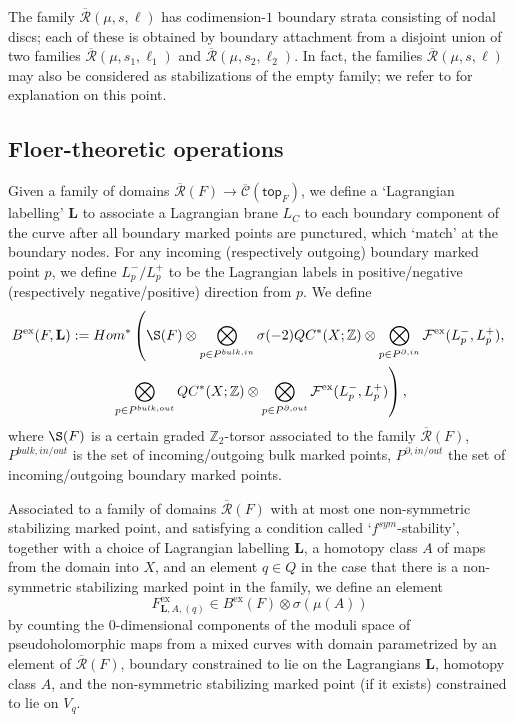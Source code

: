 \documentclass{article}
\def\fuk{\EuF}
\def\cC{\mathcal{C}}
\def\Z{\mathbb{Z}}
\def\fuk{\mathcal{F}}
\def\Rbar{\overline{\mathcal{R}}}
\def\Cbar{\overline{\mathcal{C}}}
\def\Cbar{\overline{\cC}}
\def\top{{\mathsf{top}}}
\def\bL{\mathbf{L}}
\def\ex{\mathrm{ex}}
\begin{document}
The family $\Rbar(\mu,s,\ell)$ has codimension-$1$ boundary strata consisting of nodal discs; each of these is obtained by boundary attachment from a disjoint union of two families $\Rbar(\mu,s_1,\ell_1)$ and $\Rbar(\mu,s_2,\ell_2)$. 
In fact, the families $\Rbar(\mu,s,\ell)$ may also be considered as stabilizations of the empty family; we refer to \cite[Section 3.1]{relfukii} for explanation on this point.

\subsection{Floer-theoretic operations}

Given a family of domains $\Rbar(F) \to \Cbar(\top_F)$, we define a `Lagrangian labelling' $\bL$ to associate a Lagrangian brane $L_C$ to each boundary component of the curve after all boundary marked points are punctured, which `match' at the boundary nodes. 
For any incoming (respectively outgoing) boundary marked point $p$, we define $L_p^-/L_p^+$ to be the Lagrangian labels in positive/negative (respectively negative/positive) direction from $p$. 
We define
\begin{multline}
B^\ex(F,\bL) := Hom^*\left(\S(F) \otimes \bigotimes_{p \in P^{bulk,in}} \sigma(-2)QC^*(X;\Z) \otimes \bigotimes_{p \in P^{\partial,in}} \fuk^{\ex}(L_p^-,L_p^+) ,\right.\\
\left.\bigotimes_{p \in P^{bulk,out}} QC^*(X;\Z) \otimes  \bigotimes_{p \in P^{\partial,out}} \fuk^{\ex}(L_p^-,L_p^+)\right),
 \end{multline}
 where $\S(F)$ is a certain graded $\Z_2$-torsor associated to the family $\Rbar(F)$, $P^{bulk,in/out}$ is the set of incoming/outgoing bulk marked points, $P^{\partial,in/out}$ the set of incoming/outgoing boundary marked points. 

Associated to a family of domains $\Rbar(F)$ with at most one non-symmetric stabilizing marked point, and satisfying a condition called `$f^{sym}$-stability', together with a choice of Lagrangian labelling $\bL$, a homotopy class $A$ of maps from the domain into $X$, and an element $q \in Q$ in the case that there is a non-symmetric stabilizing marked point in the family, we define an element
$$F^\ex_{\bL,A,(q)} \in B^\ex(F) \otimes \sigma(\mu(A))$$
by counting the $0$-dimensional components of the moduli space of pseudoholomorphic maps from a mixed curves with domain parametrized by an element of $\Rbar(F)$, boundary constrained to lie on the Lagrangians $\bL$, homotopy class $A$, and the non-symmetric stabilizing marked point (if it exists) constrained to lie on $V_q$. 
\end{document}
